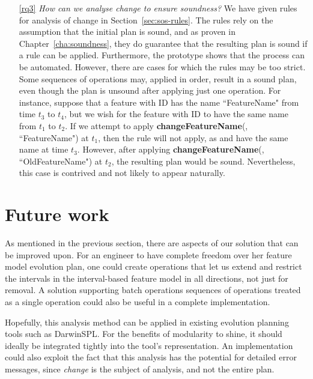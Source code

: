 \begin{enumerate}
   \item[\ref{rq3}] \textit{How can we analyse change to ensure soundness?} 
      We have given rules for analysis of change in Section~\vref{sec:sos-rules}. The rules rely on the assumption that the initial plan is sound, and as proven in Chapter~\vref{cha:soundness}, they do guarantee that the resulting plan is sound if a rule can be applied. Furthermore, the prototype  shows that the process can be automated. However, there are cases for which the rules may be too strict. Some sequences of operations may, applied in order, result in a sound plan, even though the plan is unsound after applying just one operation. For instance, suppose that a feature with ID  has the name ``FeatureName" from time $t_3$ to $t_4$, but we wish for the feature with ID  to have the same name from $t_1$ to $t_2$. If we attempt to apply \textbf{changeFeatureName}(, ``FeatureName") at $t_1$, then the  rule will not apply, as  and  have the same name at time $t_3$. However, after applying \textbf{changeFeatureName}(, ``OldFeatureName") at $t_2$, the resulting plan would be sound.
      Nevertheless, this case is contrived and not likely to appear naturally. 
      
\end{enumerate}

\section{Future work}

As mentioned in the previous section, there are aspects of our solution that can be improved upon. For an engineer to have complete freedom over her feature model evolution plan, one could create operations that let us extend and restrict the intervals in the interval-based feature model in all directions, not just for removal. A solution supporting batch operations \textemdash{} sequences of operations treated as a single operation \textemdash{} could also be useful in a complete implementation. 

Hopefully, this analysis method can be applied in existing evolution planning tools such as DarwinSPL. For the benefits of modularity to shine, it should ideally be integrated tightly into the tool's representation. An implementation could also exploit the fact that this analysis has the potential for detailed error messages, since \emph{change} is the subject of analysis, and not the entire plan.

